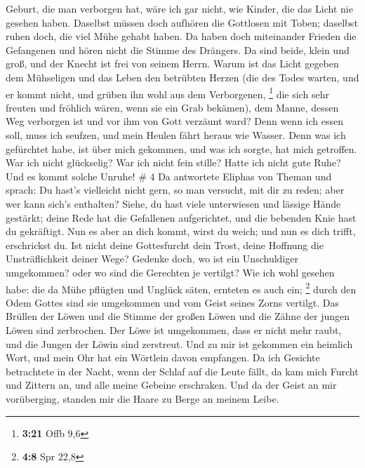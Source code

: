 Geburt, die man verborgen hat, wäre ich gar nicht, wie Kinder, die das
Licht nie gesehen haben.  Daselbst müssen doch aufhören die
Gottlosen mit Toben; daselbst ruhen doch, die viel Mühe gehabt haben.
 Da haben doch miteinander Frieden die Gefangenen und hören
nicht die Stimme des Drängers.  Da sind beide, klein und
groß, und der Knecht ist frei von seinem Herrn.  Warum ist
das Licht gegeben dem Mühseligen und das Leben den betrübten Herzen
 (die des Todes warten, und er kommt nicht, und grüben ihn
wohl aus dem Verborgenen, \footnote{\textbf{3:21} Offb 9,6}
 die sich sehr freuten und fröhlich wären, wenn sie ein
Grab bekämen),  dem Manne, dessen Weg verborgen ist und vor
ihm von Gott verzäunt ward?  Denn wenn ich essen soll, muss
ich seufzen, und mein Heulen fährt heraus wie Wasser.  Denn
was ich gefürchtet habe, ist über mich gekommen, und was ich sorgte, hat
mich getroffen.  War ich nicht glückselig? War ich nicht
fein stille? Hatte ich nicht gute Ruhe? Und es kommt solche Unruhe! \# 4
 Da antwortete Eliphas von Theman und sprach: 
Du hast's vielleicht nicht gern, so man versucht, mit dir zu reden; aber
wer kann sich's enthalten?  Siehe, du hast viele unterwiesen
und lässige Hände gestärkt;  deine Rede hat die Gefallenen
aufgerichtet, und die bebenden Knie hast du gekräftigt.  Nun
es aber an dich kommt, wirst du weich; und nun es dich trifft,
erschrickst du.  Ist nicht deine Gottesfurcht dein Trost,
deine Hoffnung die Unsträflichkeit deiner Wege?  Gedenke
doch, wo ist ein Unschuldiger umgekommen? oder wo sind die Gerechten je
vertilgt?  Wie ich wohl gesehen habe: die da Mühe pflügten
und Unglück säten, ernteten es auch ein; \footnote{\textbf{4:8} Spr 22,8}
 durch den Odem Gottes sind sie umgekommen und vom Geist
seines Zorns vertilgt.  Das Brüllen der Löwen und die
Stimme der großen Löwen und die Zähne der jungen Löwen sind zerbrochen.
 Der Löwe ist umgekommen, dass er nicht mehr raubt, und die
Jungen der Löwin sind zerstreut.  Und zu mir ist gekommen
ein heimlich Wort, und mein Ohr hat ein Wörtlein davon empfangen.
 Da ich Gesichte betrachtete in der Nacht, wenn der Schlaf
auf die Leute fällt,  da kam mich Furcht und Zittern an,
und alle meine Gebeine erschraken.  Und da der Geist an mir
vorüberging, standen mir die Haare zu Berge an meinem Leibe.

